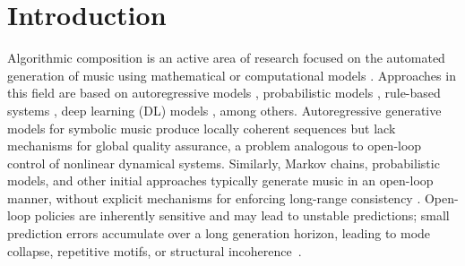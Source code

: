\documentclass[letterpaper, 10 pt, conference]{ieeeconf}
\begin{document}

\section{Introduction}
Algorithmic composition is an active area of research focused on the automated generation of music using mathematical or computational models \cite{Nierhaus2009}. Approaches in this field are based on autoregressive models \cite{Yu2026,Nierhaus2009}, probabilistic models \cite{Allan2004}, rule-based systems \cite{Boenn2010,Anders2012},  deep learning (DL) models \cite{Briot2020}, among others.  Autoregressive generative models for symbolic music produce locally coherent sequences but lack mechanisms for global quality assurance, a problem analogous to open-loop control of nonlinear dynamical systems. Similarly, Markov chains, probabilistic models, and other initial approaches typically generate music in an open-loop manner, without explicit mechanisms for enforcing long-range consistency \cite{Allan2004,Loy2006}.
Open-loop policies are inherently sensitive and may lead to unstable predictions; small prediction errors accumulate over a long generation horizon, leading to mode collapse, repetitive motifs, or structural incoherence~\cite{Astrom2008,holtzman2020curious}.
\end{document}
